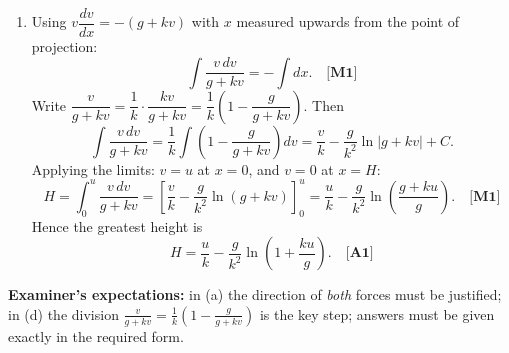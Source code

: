 \documentclass[11pt]{article}
\begin{document}
\begin{corrige}
\begin{enumerate}
\item Using $v\dfrac{dv}{dx} = -(g + kv)$ with $x$ measured upwards from the point of projection:
\[
\int \frac{v\,dv}{g + kv} = -\int dx. \quad \textbf{[M1]}
\]
Write $\dfrac{v}{g+kv} = \dfrac{1}{k}\cdot\dfrac{kv}{g+kv} = \dfrac{1}{k}\left(1 - \dfrac{g}{g+kv}\right)$. Then
\[
\int \frac{v\,dv}{g+kv} = \frac{1}{k}\int\left(1 - \frac{g}{g+kv}\right)dv = \frac{v}{k} - \frac{g}{k^2}\ln|g + kv| + C.
\]
Applying the limits: $v = u$ at $x = 0$, and $v = 0$ at $x = H$:
\[
H = \int_0^u \frac{v\,dv}{g + kv} = \left[\frac{v}{k} - \frac{g}{k^2}\ln(g + kv)\right]_0^u = \frac{u}{k} - \frac{g}{k^2}\ln\!\left(\frac{g + ku}{g}\right). \quad \textbf{[M1]}
\]
Hence the greatest height is
\[
\boxed{H = \frac{u}{k} - \frac{g}{k^2}\ln\left(1 + \frac{ku}{g}\right)}. \quad \textbf{[A1]}
\]
\end{enumerate}

\medskip
\textbf{Examiner's expectations:} in (a) the direction of \emph{both} forces must be justified; in (d) the division $\frac{v}{g+kv} = \frac1k\left(1 - \frac{g}{g+kv}\right)$ is the key step; answers must be given exactly in the required form.
\end{corrige}
\end{document}
